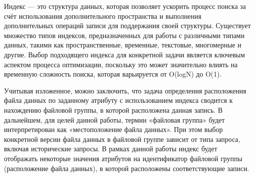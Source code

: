 Индекс — это структура данных, которая позволяет ускорить процесс поиска за счёт использования дополнительного пространства и выполнения дополнительных операций записи для поддержания своей структуры. Существует множество типов индексов, предназначенных для работы с различными типами данных, такими как пространственные, временные, текстовые, многомерные и другие. Выбор подходящего индекса для конкретной задачи является ключевым аспектом процесса оптимизации, поскольку это может значительно влиять на временную сложность поиска, которая варьируется от O(logN) до O(1).

Учитывая изложенное, можно заключить, что задача определения расположения файла данных по заданному атрибуту с использованием индекса сводится к нахождению файловой группы, в которой расположена данная запись. В дальнейшем, для целей данной работы, термин «файловая группа» будет интерпретирован как «местоположение файла данных». При этом выбор конкретной версии файла данных в файловой группе зависит от типа запроса, включая исторические запросы. В рамках данной работы индекс будет отображать некоторые значения атрибутов на идентификатор файловой группы (расположение файла данных), в которой расположены соответствующие записи.